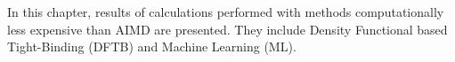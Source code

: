 \label{chapter:alternatives-to-aimd}

In this chapter, results of calculations performed with methods computationally less expensive than AIMD are presented. They include Density Functional based Tight-Binding (DFTB) and Machine Learning (ML).